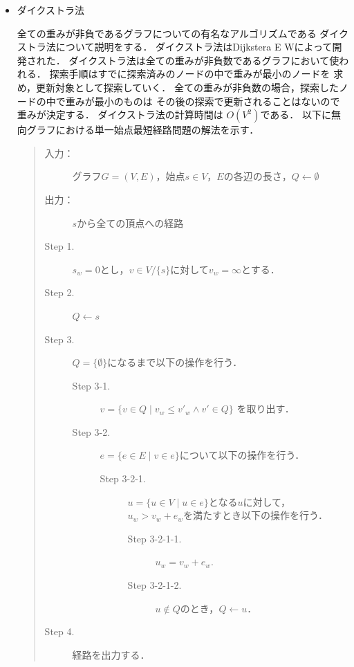 \documentclass[12pt]{optlab-bachelor}
\begin{document}
\begin{itemize}
  \item ダイクストラ法

  全ての重みが非負であるグラフについての有名なアルゴリズムである
  ダイクストラ法について説明をする．
  ダイクストラ法はDijkstera E W\cite{Dijkstera}によって開発された．
  ダイクストラ法は全ての重みが非負数であるグラフにおいて使われる．
  探索手順はすでに探索済みのノードの中で重みが最小のノードを
  求め，更新対象として探索していく．
  全ての重みが非負数の場合，探索したノードの中で重みが最小のものは
  その後の探索で更新されることはないので重みが決定する．
  ダイクストラ法の計算時間は $O(V^2)$である．
  以下に無向グラフにおける単一始点最短経路問題の解法を示す．

  \begin{quote}
    \begin{description}
      \item[入力：] グラフ$G=(V,E)$，始点$s \in V$，$E$の各辺の長さ，$Q \leftarrow \emptyset$
      \item[出力：] $s$から全ての頂点への経路
      \item[Step 1.] $s_w = 0$とし，$v \in V/ \{ s\}$に対して$v_w = \infty$とする．
      \item[Step 2.] $Q \leftarrow s$
      \item[Step 3.] $Q = \{\emptyset\}$になるまで以下の操作を行う．
      \begin{description}
        \item[Step 3-1.] $v = \{ v \in Q \mid v_w \leq v'_w \land v' \in Q \}$
        を取り出す．
        \item[Step 3-2.] $e = \{ e \in E \mid v \in e \}$について以下の操作を行う．

        \begin{description}
          \item[Step 3-2-1.] $u = \{ u \in V \mid u \in e\}$となる$u$に対して，
          $u_w > v_w + e_w$を満たすとき以下の操作を行う．

          \begin{description}
            \item[Step 3-2-1-1.] $u_w = v_w + e_w$.
            \item[Step 3-2-1-2.] $u \notin Q$のとき，$Q \leftarrow u$．
          \end{description}
        \end{description}
      \end{description}

      \item[Step 4.] 経路を出力する．
    \end{description}
  \end{quote}
\end{itemize}
\end{document}
